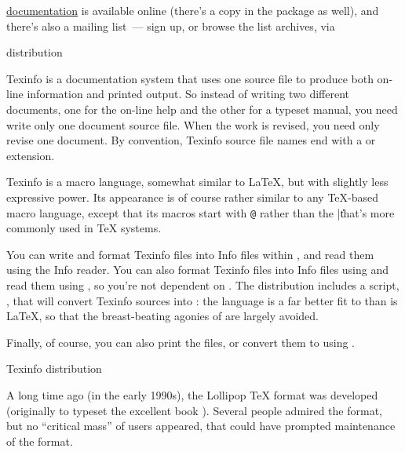 \href{http://tug.org/docs/html/eplain}{\Eplain{} documentation} is
available online (there's a  copy in the 
package as well), and there's also a mailing list~--- sign up, or
browse the list archives, via
\begin{ctanrefs}
\item[\nothtml{\rmfamily}\Eplain{} distribution]
\end{ctanrefs}


Texinfo is a documentation system that uses one source file to produce
both on-line information and printed output.  So instead of writing
two different documents, one for the on-line help and the other for a
typeset manual, you need write only one document source file.  When
the work is revised, you need only revise one document.  By
convention, Texinfo source file names end with a  or
 extension.

Texinfo is a macro language, somewhat similar to \LaTeX{}, but with
slightly less expressive power.  Its appearance is of course rather
similar to any \TeX{}-based macro language, except that its macros
start with \texttt{@} rather than the |\| that's more commonly used in
\TeX{} systems.

You can write and format Texinfo files into Info files within 
, and read them using the  Info
reader.  You can also format Texinfo files into Info files using
 and read them using , so you're not
dependent on .  The distribution includes a
 script, , that will convert
Texinfo sources into : the language is a far better fit to
 than is \LaTeX{}, so that the breast-beating agonies of
 are largely
avoided.

Finally, of course, you can also print the files, or convert them to
 using \PDFTeX{}.
\begin{ctanrefs}
\item[\nothtml{\rmfamily}Texinfo distribution]
\end{ctanrefs}


A long time ago (in the early 1990s), the Lollipop \TeX{} format was
developed (originally to typeset the excellent book %
).  Several people admired the
format, but no ``critical mass'' of users appeared, that could have
prompted maintenance of the format.

